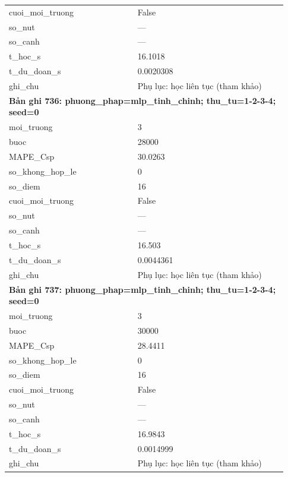 \begin{longtable}{p{0.43\linewidth}p{0.50\linewidth}}
cuoi\_\allowbreak moi\_\allowbreak truong & False \\
so\_\allowbreak nut & — \\
so\_\allowbreak canh & — \\
t\_\allowbreak hoc\_\allowbreak s & 16.1018 \\
t\_\allowbreak du\_\allowbreak doan\_\allowbreak s & 0.0020308 \\
ghi\_\allowbreak chu & Phụ lục: học liên tục (tham khảo) \\
\midrule
\multicolumn{2}{p{0.95\linewidth}}{\textbf{Bản ghi 736: phuong\_phap=mlp\_tinh\_chinh; thu\_tu=1-2-3-4; seed=0}} \\
moi\_\allowbreak truong & 3 \\
buoc & 28000 \\
MAPE\_\allowbreak Csp & 30.0263 \\
so\_\allowbreak khong\_\allowbreak hop\_\allowbreak le & 0 \\
so\_\allowbreak diem & 16 \\
cuoi\_\allowbreak moi\_\allowbreak truong & False \\
so\_\allowbreak nut & — \\
so\_\allowbreak canh & — \\
t\_\allowbreak hoc\_\allowbreak s & 16.503 \\
t\_\allowbreak du\_\allowbreak doan\_\allowbreak s & 0.0044361 \\
ghi\_\allowbreak chu & Phụ lục: học liên tục (tham khảo) \\
\midrule
\multicolumn{2}{p{0.95\linewidth}}{\textbf{Bản ghi 737: phuong\_phap=mlp\_tinh\_chinh; thu\_tu=1-2-3-4; seed=0}} \\
moi\_\allowbreak truong & 3 \\
buoc & 30000 \\
MAPE\_\allowbreak Csp & 28.4411 \\
so\_\allowbreak khong\_\allowbreak hop\_\allowbreak le & 0 \\
so\_\allowbreak diem & 16 \\
cuoi\_\allowbreak moi\_\allowbreak truong & False \\
so\_\allowbreak nut & — \\
so\_\allowbreak canh & — \\
t\_\allowbreak hoc\_\allowbreak s & 16.9843 \\
t\_\allowbreak du\_\allowbreak doan\_\allowbreak s & 0.0014999 \\
ghi\_\allowbreak chu & Phụ lục: học liên tục (tham khảo) \\

\end{longtable}
